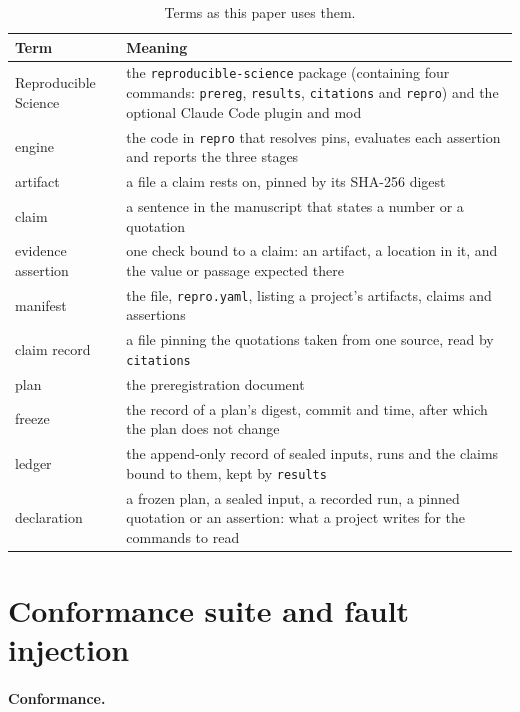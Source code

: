 \documentclass{article}
\newcommand{\code}[1]{\texttt{#1}}
\newcommand{\tPlan}{\code{prereg}}
\newcommand{\tRun}{\code{results}}
\newcommand{\tCite}{\code{citations}}
\newcommand{\tVerify}{\code{repro}}
\begin{document}
\begin{table}[H]
\centering
\small
\caption{Terms as this paper uses them.}
\label{tab:terms}
\begin{tabular}{@{}>{\raggedright\arraybackslash}p{}>{\raggedright\arraybackslash}p{}@{}}
\toprule
\textbf{Term} & \textbf{Meaning} \\
\midrule
Reproducible Science & the \code{reproducible-science} package (containing four commands: \tPlan{}, \tRun{}, \tCite{} and \tVerify{}) and the optional Claude Code plugin and mod \\
engine & the code in \tVerify{} that resolves pins, evaluates each assertion and reports the three stages \\
artifact & a file a claim rests on, pinned by its SHA-256 digest \\
claim & a sentence in the manuscript that states a number or a quotation \\
evidence assertion & one check bound to a claim: an artifact, a location in it, and the value or passage expected there \\
manifest & the file, \code{repro.yaml}, listing a project's artifacts, claims and assertions \\
claim record & a file pinning the quotations taken from one source, read by \tCite{} \\
plan & the preregistration document \\
freeze & the record of a plan's digest, commit and time, after which the plan does not change \\
ledger & the append-only record of sealed inputs, runs and the claims bound to them, kept by \tRun{} \\
declaration & a frozen plan, a sealed input, a recorded run, a pinned quotation or an assertion: what a project writes for the commands to read \\
\bottomrule
\end{tabular}
\end{table}

\section{Conformance suite and fault injection}
\label{sec:suite}

\paragraph{Conformance.}
\end{document}
